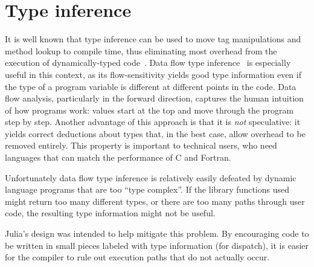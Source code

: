 \documentclass[pldi]{sigplanconf-pldi15}
\begin{document}


\section{Type inference}
\label{sec:inference}

It is well known that type inference can be used to move tag manipulations
and method lookup to compile time, thus eliminating most overhead from
the execution of dynamically-typed code~\cite{Kaplan1977,Kaplan1980}.
Data flow type inference~\cite{Nielson2005,Khedker2009}
is especially useful in this context, as its
flow-sensitivity yields good type information even if the type of a program
variable is different at different points in the code.
Data flow analysis, particularly in the
forward direction, captures the human intuition of how programs work:
values start at the top and move through the program step by step.
Another advantage of this approach is that it is \emph{not} speculative:
it yields correct deductions about types that, in the best case, allow
overhead to be removed entirely. This property is important to technical
users, who need languages that can match the performance of C and Fortran.

Unfortunately data flow type inference is relatively easily defeated
by dynamic language programs that are too ``type complex''. If the library
functions used might return too many different types, or there are too
many paths through user code, the resulting type information might not
be useful.

Julia's design was intended to help mitigate this problem. By encouraging
code to be written in small pieces labeled with type information (for
dispatch), it is easier for the compiler to rule out execution paths
that do not actually occur.
\end{document}
